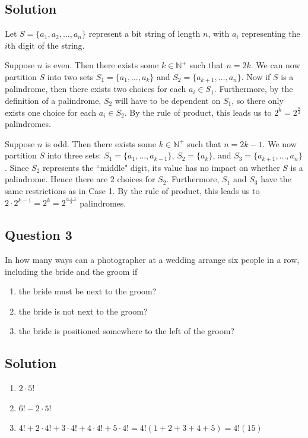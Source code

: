 \documentclass{article}
\begin{document}
\subsection*{Solution}
    Let $S = \{a_{1}, a_{2}, \dots, a_{n}\}$ represent a bit string of length $n$, with $a_{i}$ representing the $i$th digit of the string.
    \begin{Cases}
        \item Suppose $n$ is even. Then there exists some $k \in \mathbb{N}^{+}$ such that $n = 2k$. We can now partition $S$ into two sets $S_{1} = \{a_{1}, \dots, a_{k}\}$ and $S_{2} = \{a_{k + 1}, \dots, a_{n}\}$. Now if $S$ is a palindrome, then there exists two choices for each $a_{i} \in S_{1}$. Furthermore, by the definition of a palindrome, $S_{2}$ will have to be dependent on $S_{1}$, so there only exists one choice for each $a_{i} \in S_{2}$. By the rule of product, this leads us to $2^{k} = 2^{\frac{n}{2}}$ palindromes.
        \item Suppose $n$ is odd. Then there exists some $k \in \mathbb{N}^{+}$ such that $n = 2k - 1$. We now partition $S$ into three sets: $S_{1} = \{a_{1}, \dots, a_{k - 1}\}$, $S_{2} = \{a_{k}\}$, and $S_{3} = \{a_{k + 1}, \dots, a_{n}\}$. Since $S_{2}$ represents the ``middle" digit, its value has no impact on whether $S$ is a palindrome. Hence there are $2$ choices for $S_{2}$. Furthermore, $S_{1}$ and $S_{3}$ have the same restrictions as in Case 1. By the rule of product, this leads us to $2 \cdot 2^{k - 1} = 2^{k} = 2^{\frac{n + 1}{2}}$ palindromes.
    \end{Cases}

\subsection*{Question 3}
    In how many ways can a photographer at a wedding arrange six people in a row, including the bride and the groom if 
    \begin{enumerate}
        \item the bride must be next to the groom?
        \item the bride is not next to the groom?
        \item the bride is positioned somewhere to the left of the groom?
    \end{enumerate}

\subsection*{Solution}
    \begin{enumerate}
        \item $2 \cdot 5!$
        \item $6! - 2 \cdot 5!$
        \item $4! + 2 \cdot 4! + 3 \cdot 4! + 4 \cdot 4! + 5 \cdot 4! = 4!(1 + 2 + 3 + 4 + 5) = 4!(15)$
    \end{enumerate}
\end{document}
